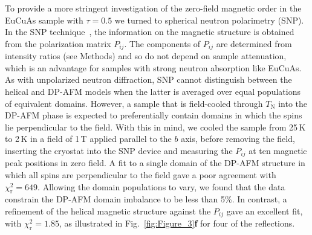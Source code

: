 \documentclass[aps,prl,amsmath,amssymb,amstext,citeautoscript,punctuation,nofootinbib,superscriptaddress,twocolumn]{revtex4-1}
\begin{document}
To provide a more stringent investigation of the zero-field magnetic order in the EuCuAs sample with $\tau = 0.5$ we turned to spherical neutron polarimetry (SNP). In the SNP technique~\cite{Boothroyd_book}, the information on the magnetic structure is obtained from the polarization matrix $P_{ij}$. The components of $P_{ij}$ are determined from intensity ratios (see Methods) and so do not depend on sample attenuation, which is an advantage for samples with strong neutron absorption like EuCuAs. As with unpolarized neutron diffraction, SNP cannot distinguish between the helical and DP-AFM  models when the latter is averaged over equal populations of equivalent domains. However, a sample that is field-cooled through $T_\textrm{N}$ into the DP-AFM phase is expected to preferentially contain domains in which the spins lie perpendicular to the field. With this in mind, we cooled the sample from 25\,K to 2\,K in a field of 1\,T applied parallel to the $b$ axis, before removing the field, inserting the cryostat into the SNP device and measuring the $P_{ij}$ at ten magnetic peak positions in zero field. A fit to a single domain of the DP-AFM structure in which all spins are perpendicular to the field gave a poor agreement with $\chi_\textrm{r}^2 = 649$. Allowing the domain populations to vary, we found that the data constrain the DP-AFM domain imbalance to be less than 5\%. In contrast, a refinement of the helical magnetic structure against the  $P_{ij}$ gave an excellent fit, with $\chi_\textrm{r}^2 = 1.85$, as illustrated in Fig.~\ref{fig:Figure_3}\textbf{f} for four of the reflections.

		
\end{document}
